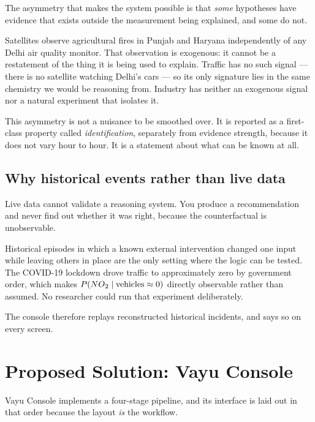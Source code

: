 \documentclass[11pt,a4paper]{article}
\newcommand{\NOx}{NO\textsubscript{2}}
\begin{document}
The asymmetry that makes the system possible is that \emph{some} hypotheses have
evidence that exists outside the measurement being explained, and some do not.

Satellites observe agricultural fires in Punjab and Haryana independently of any
Delhi air quality monitor. That observation is exogenous: it cannot be a
restatement of the thing it is being used to explain. Traffic has no such signal
--- there is no satellite watching Delhi's cars --- so its only signature lies in
the same chemistry we would be reasoning from. Industry has neither an exogenous
signal nor a natural experiment that isolates it.

This asymmetry is not a nuisance to be smoothed over. It is reported as a
first-class property called \emph{identification}, separately from evidence
strength, because it does not vary hour to hour. It is a statement about what can
be known at all.

\subsection{Why historical events rather than live data}

Live data cannot validate a reasoning system. You produce a recommendation and
never find out whether it was right, because the counterfactual is unobservable.

Historical episodes in which a known external intervention changed one input while
leaving others in place are the only setting where the logic can be tested. The
COVID-19 lockdown drove traffic to approximately zero by government order, which
makes $P(\NOx \mid \text{vehicles} \approx 0)$ directly observable rather than
assumed. No researcher could run that experiment deliberately.

The console therefore replays reconstructed historical incidents, and says so on
every screen.

\section{Proposed Solution: Vayu Console}

Vayu Console implements a four-stage pipeline, and its interface is laid out in
that order because the layout \emph{is} the workflow.
\end{document}

